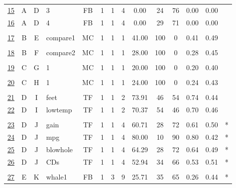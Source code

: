 \documentclass[12pt,nohyper]{tufte-handout}\usepackage[]{graphicx}\usepackage[]{color}
\begin{document}
\begin{longtable}{cccl|cccc|ccccc|l}
  \hyperlink{T06.A.D.04.1.1.FB.3.2}{15} & A & D & 3 & FB &   1 &   1 &   4 & 0.00 &  24 &  76 & 0.00 & 0.00 &  \\ 
  \hyperlink{T06.A.D.04.1.1.FB.4.2}{16} & A & D & 4 & FB &   1 &   1 &   4 & 0.00 &  29 &  71 & 0.00 & 0.00 &  \\ 
   &  &  &  &  &  &  &  &  &  &  &  &  &  \\ 
  \hyperlink{T06.B.E.01.1.1.MC.compare1.2}{17} & B & E & compare1 & MC &   1 &   1 &   1 & 41.00 & 100 &   0 & 0.41 & 0.49 &  \\ 
   &  &  &  &  &  &  &  &  &  &  &  &  &  \\ 
  \hyperlink{T06.B.F.01.1.1.MC.compare2.2}{18} & B & F & compare2 & MC &   1 &   1 &   1 & 28.00 & 100 &   0 & 0.28 & 0.45 &  \\ 
   &  &  &  &  &  &  &  &  &  &  &  &  &  \\ 
  \hyperlink{T06.C.G.01.1.1.MC.1.2}{19} & C & G & 1 & MC &   1 &   1 &   1 & 20.00 & 100 &   0 & 0.20 & 0.40 &  \\ 
   &  &  &  &  &  &  &  &  &  &  &  &  &  \\ 
  \hyperlink{T06.C.H.01.1.1.MC.1.2}{20} & C & H & 1 & MC &   1 &   1 &   1 & 24.00 & 100 &   0 & 0.24 & 0.43 &  \\ 
   &  &  &  &  &  &  &  &  &  &  &  &  &  \\ 
  \hyperlink{T06.D.I.02.1.1.TF.feet.2}{21} & D & I & feet & TF &   1 &   1 &   2 & 73.91 &  46 &  54 & 0.74 & 0.44 &  \\ 
  \hyperlink{T06.D.I.02.1.1.TF.lowtemp.2}{22} & D & I & lowtemp & TF &   1 &   1 &   2 & 70.37 &  54 &  46 & 0.70 & 0.46 &  \\ 
   &  &  &  &  &  &  &  &  &  &  &  &  &  \\ 
  \hyperlink{T06.D.J.04.1.1.TF.gain.2}{23} & D & J & gain & TF &   1 &   1 &   4 & 60.71 &  28 &  72 & 0.61 & 0.50 & * \\ 
  \hyperlink{T06.D.J.04.1.1.TF.mpg.2}{24} & D & J & mpg & TF &   1 &   1 &   4 & 80.00 &  10 &  90 & 0.80 & 0.42 & * \\ 
  \hyperlink{T06.D.J.04.1.1.TF.blowhole.2}{25} & D & J & blowhole & TF &   1 &   1 &   4 & 64.29 &  28 &  72 & 0.64 & 0.49 & * \\ 
  \hyperlink{T06.D.J.04.1.1.TF.CDs.2}{26} & D & J & CDs & TF &   1 &   1 &   4 & 52.94 &  34 &  66 & 0.53 & 0.51 & * \\ 
   &  &  &  &  &  &  &  &  &  &  &  &  &  \\ 
  \hyperlink{T06.E.K.09.3.1.FB.whale1.2}{27} & E & K & whale1 & FB &   1 &   3 &   9 & 25.71 &  35 &  65 & 0.26 & 0.44 & * \\ 

\end{longtable}
\end{document}
